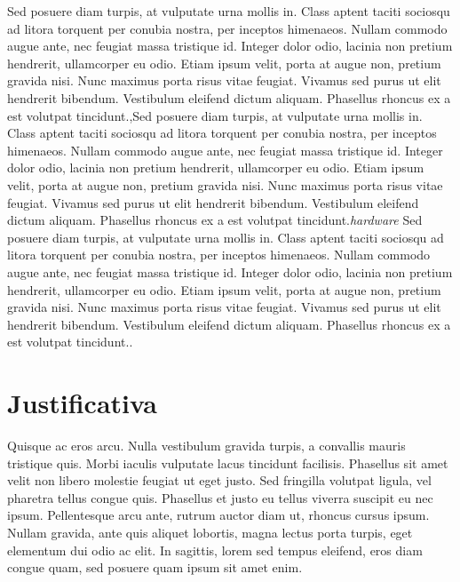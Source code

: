 \documentclass[
	12pt,				%
	openright,			%
	oneside,			%
	a4paper,			%
	chapter=TITLE,		%
	english,			%
	brazil,				%
	]{abntex2}
\begin{document}
Sed posuere diam turpis, at vulputate urna mollis in. Class aptent taciti sociosqu ad litora torquent per conubia nostra, per inceptos himenaeos. Nullam commodo augue ante, nec feugiat massa tristique id. Integer dolor odio, lacinia non pretium hendrerit, ullamcorper eu odio. Etiam ipsum velit, porta at augue non, pretium gravida nisi. Nunc maximus porta risus vitae feugiat. Vivamus sed purus ut elit hendrerit bibendum. Vestibulum eleifend dictum aliquam. Phasellus rhoncus ex a est volutpat tincidunt.\cite{rtpimg},Sed posuere diam turpis, at vulputate urna mollis in. Class aptent taciti sociosqu ad litora torquent per conubia nostra, per inceptos himenaeos. Nullam commodo augue ante, nec feugiat massa tristique id. Integer dolor odio, lacinia non pretium hendrerit, ullamcorper eu odio. Etiam ipsum velit, porta at augue non, pretium gravida nisi. Nunc maximus porta risus vitae feugiat. Vivamus sed purus ut elit hendrerit bibendum. Vestibulum eleifend dictum aliquam. Phasellus rhoncus ex a est volutpat tincidunt.\textit{hardware} Sed posuere diam turpis, at vulputate urna mollis in. Class aptent taciti sociosqu ad litora torquent per conubia nostra, per inceptos himenaeos. Nullam commodo augue ante, nec feugiat massa tristique id. Integer dolor odio, lacinia non pretium hendrerit, ullamcorper eu odio. Etiam ipsum velit, porta at augue non, pretium gravida nisi. Nunc maximus porta risus vitae feugiat. Vivamus sed purus ut elit hendrerit bibendum. Vestibulum eleifend dictum aliquam. Phasellus rhoncus ex a est volutpat tincidunt.\cite{singh2013mprtp}.

\chapter{Justificativa}
Quisque ac eros arcu. Nulla vestibulum gravida turpis, a convallis mauris tristique quis. Morbi iaculis vulputate lacus tincidunt facilisis. Phasellus sit amet velit non libero molestie feugiat ut eget justo. Sed fringilla volutpat ligula, vel pharetra tellus congue quis. Phasellus et justo eu tellus viverra suscipit eu nec ipsum. Pellentesque arcu ante, rutrum auctor diam ut, rhoncus cursus ipsum. Nullam gravida, ante quis aliquet lobortis, magna lectus porta turpis, eget elementum dui odio ac elit. In sagittis, lorem sed tempus eleifend, eros diam congue quam, sed posuere quam ipsum sit amet enim.\cite{ahsan2011multipath}
\end{document}
